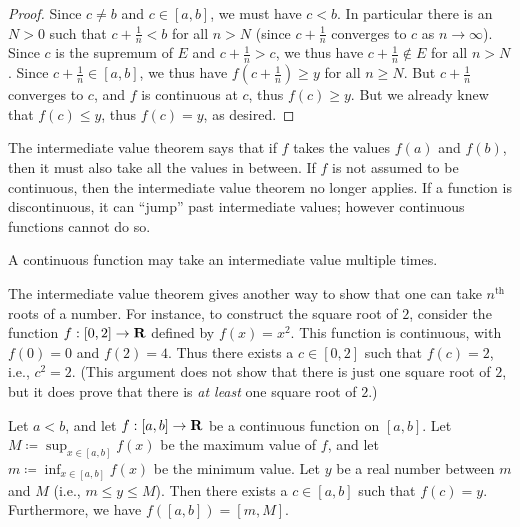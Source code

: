 \begin{proof}
  Since \(c \neq b\) and \(c \in [a, b]\), we must have \(c < b\).
  In particular there is an \(N > 0\) such that \(c + \frac{1}{n} < b\) for all \(n > N\)
  (since \(c + \frac{1}{n}\) converges to \(c\) as \(n \to \infty\)).
  Since \(c\) is the supremum of \(E\) and \(c + \frac{1}{n} > c\), we thus have \(c + \frac{1}{n} \notin E\) for all \(n > N\).
  Since \(c + \frac{1}{n} \in [a, b]\), we thus have \(f(c + \frac{1}{n}) \geq y\) for all \(n \geq N\).
  But \(c + \frac{1}{n}\) converges to \(c\), and \(f\) is continuous at \(c\), thus \(f(c) \geq y\).
  But we already knew that \(f(c) \leq y\), thus \(f(c) = y\), as desired.
\end{proof}

\begin{note}
  The intermediate value theorem says that if \(f\) takes the values \(f(a)\) and \(f(b)\), then it must also take all the values in between.
  If \(f\) is not assumed to be continuous, then the intermediate value theorem no longer applies.
  If a function is discontinuous, it can ``jump'' past intermediate values;
  however continuous functions cannot do so.
\end{note}

\begin{remark}\label{9.7.2}
  A continuous function may take an intermediate value multiple times.
\end{remark}

\begin{remark}\label{9.7.3}
  The intermediate value theorem gives another way to show that one can take \(n^{\text{th}}\) roots of a number.
  For instance, to construct the square root of \(2\), consider the function \(f : [0, 2] \to \mathbf{R}\) defined by \(f(x) = x^2\).
  This function is continuous, with \(f(0) = 0\) and \(f(2) = 4\).
  Thus there exists a \(c \in [0, 2]\) such that \(f(c) = 2\), i.e., \(c^2 = 2\).
  (This argument does not show that there is just one square root of \(2\), but it does prove that there is \emph{at least} one square root of \(2\).)
\end{remark}

\begin{corollary}\label{9.7.4}
  Let \(a < b\), and let \(f : [a, b] \to \mathbf{R}\) be a continuous function on \([a, b]\).
  Let \(M \coloneqq \sup_{x \in [a, b]} f(x)\) be the maximum value of \(f\), and let \(m \coloneqq \inf_{x \in [a, b]} f(x)\) be the minimum value.
  Let \(y\) be a real number between \(m\) and \(M\) (i.e., \(m \leq y \leq M\)).
  Then there exists a \(c \in [a, b]\) such that \(f(c) = y\).
  Furthermore, we have \(f([a, b]) = [m, M]\).
\end{corollary}


